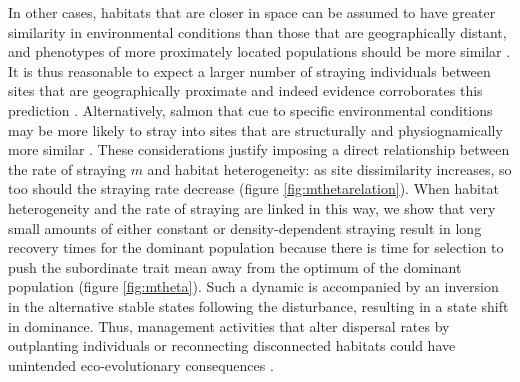\documentclass{revtex4}
\begin{document}
In other cases, habitats that are closer in space can be assumed to have greater similarity in environmental conditions than those that are geographically distant, and phenotypes of more proximately located populations should be more similar \citep{Reisenbichler:1988ex,Fraser:2011co,Westley:2012ui}.
It is thus reasonable to expect a larger number of straying individuals between sites that are geographically proximate and indeed evidence corroborates this prediction \citep{Candy:2000hu,JPE:JPE1383}.
Alternatively, salmon that cue to specific environmental conditions may be more likely to stray into sites that are structurally and physiognamically more similar \citep{Peterson:2014gy}.
These considerations justify imposing a direct relationship between the rate of straying $m$ and habitat heterogeneity: as site dissimilarity increases, so too should the straying rate decrease (figure \ref{fig:mthetarelation}).
When habitat heterogeneity and the rate of straying are linked in this way, we show that very small amounts of either constant or density-dependent straying result in long recovery times for the dominant population because there is time for selection to push the subordinate trait mean away from the optimum of the dominant population (figure \ref{fig:mtheta}). %
Such a dynamic is accompanied by an inversion in the alternative stable states following the disturbance, resulting in a state shift in dominance.
Thus, management activities that alter dispersal rates by outplanting individuals or reconnecting disconnected habitats could have unintended eco-evolutionary consequences  \citep{Anderson:2013bf,Pess:2014isa}.
\end{document}
